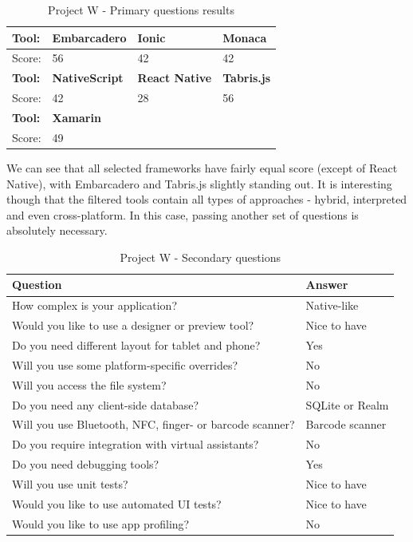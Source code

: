 \documentclass[english,master,public,dept460,male,cpdeclaration,oneside]{diploma}
\begin{document}
\begin{table}[!h]
	\centering
	\caption{Project W - Primary questions results}
	\begin{tabular}{p{4cm} | p{3cm} | p{3cm} | p{3cm}}
		\toprule		
		\textbf{Tool:} & \textbf{Embarcadero} & \textbf{Ionic} & \textbf{Monaca} \\ 
		\midrule
		Score: & 56 & 42 & 42 \\ 
		\midrule
		\textbf{Tool:} & \textbf{NativeScript} & \textbf{React Native} & \textbf{Tabris.js} \\
		\midrule
		Score: & 42 & 28 & 56 \\
		\midrule
		\textbf{Tool:}& \textbf{Xamarin} & & \\	
		\midrule
		Score: & 49 & & \\	
		\midrule
	\end{tabular}
\end{table}

We can see that all selected frameworks have fairly equal score (except of React Native), with Embarcadero and Tabris.js slightly standing out. It is interesting though that the filtered tools contain all types of approaches - hybrid, interpreted and even cross-platform. In this case, passing another set of questions is absolutely necessary.

\begin{table}[!h]
	\centering
	\caption{Project W - Secondary questions}
	\begin{tabular}{p{7.5cm} | p{5cm}}
		\toprule		
		\textbf{Question} &	\textbf{Answer} \\
		\midrule
		How complex is your application? & Native-like \\
		Would you like to use a designer or preview tool? & Nice to have \\
		Do you need different layout for tablet and phone? & Yes \\
		Will you use some platform-specific overrides? & No \\
		Will you access the file system? & No \\
		Do you need any client-side database? & SQLite or Realm \\
		Will you use Bluetooth, NFC, finger- or barcode scanner? & Barcode scanner \\
		Do you require integration with virtual assistants? & No \\
		Do you need debugging tools? & Yes \\
		Will you use unit tests? & Nice to have \\
		Would you like to use automated UI tests? & Nice to have \\
		Would you like to use app profiling? & No \\		
		\midrule
	\end{tabular}
\end{table}
\end{document}
